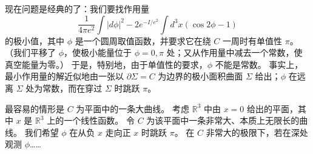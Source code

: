 现在问题是经典的了：我们要找作用量
\begin{equation}
  \tag{8.56}
  \label{eq:8-56}
  \frac{1}{4\pi e^2}\int|d\phi|^2-2e^{-I/e^2}\int d^3x\left(\cos 2\phi-1\right)
\end{equation}
的极小值，其中 $\phi$ 是一个圆周取值函数，并要求它在绕 $C$ 一周时有单值性 $\pi$。
（我们平移了 $\phi$，使极小能量位于 $\phi=0,\pi$ 处；又从作用量中减去一个常数，使真空能量为零。）
于是，特别地，由于单值性的要求，$\phi$ 不能是常数。
事实上，最小作用量的解近似地由一张以 $\partial\Sigma=C$ 为边界的极小面积曲面 $\Sigma$ 给出；$\phi$ 在远离 $\Sigma$ 处为常数，而在穿过 $\Sigma$ 时跳跃 $\pi$。



最容易的情形是 $C$ 为平面中的一条大曲线。
考虑 $\mathbb{R}^3$ 中由 $x=0$ 给出的平面，其中 $x$ 是 $\mathbb{R}^3$ 上的一个线性函数。
令 $C$ 为该平面中一条非常大、本质上无限长的曲线。
我们希望 $\phi$ 在从负 $x$ 走向正 $x$ 时跳跃 $\pi$。
在 $C$ 非常大的极限下，若在深处观测 $\phi$……%
